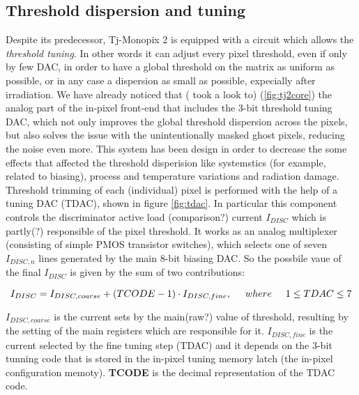 \subsection{Threshold dispersion and tuning}


Despite its predecessor, Tj-Monopix 2 is equipped with a circuit which allows the \textit{threshold tuning}. In other words it can adjust every pixel threshold, even if only by few DAC, in order to have a global threshold on the matrix as uniform as possible, or in any case a dispersion as small as possible, expecially after irradiation. We have already noticed that ( took a look to) (\vref{fig:tj2core}) the analog part of the in-pixel front-end that includes the 3-bit threshold tuning DAC, which not only improves the global threshold dispersion across the pixels, but also solves the issue with the unintentionally masked ghost pixels, reducing the noise even more. This system has been design in order to decrease the some effects that affected the threshold disperision like systemstics (for example, related to biasing), process and temperature variations and radiation damage. \\

Threshold trimming of each (individual) pixel is performed with the help of a tuning DAC (TDAC), shown in figure \vref{fig:tdac}. In particular this component controls the discriminator active load (comparison?) current $I_{DISC}$ which is partly(?) responsible of the pixel threshold. It works as an analog multiplexer (consisting of simple PMOS transistor switches), which selects one of seven $I_{DISC, n}$ lines generated by the main 8-bit biasing DAC. So the possbile vaue of the final $I_{DISC}$ is given by the sum of two contributions:

\begin{equation}
I_{DISC} = I_{DISC, coarse} + (TCODE - 1) \cdot I_{DISC,fine},  \hspace{.5cm}	where \hspace{.5cm} 1 \leq TDAC \leq 7
\end{equation}

\textbf{$I_{DISC, coarse}$} is the current sets by the main(raw?) value of threshold, resulting by the setting of the main registers which are responsible for it. 
\textbf{$I_{DISC, fine}$} is the current selected by the fine tuning step (TDAC) and it depends on the 3-bit tunning code that is stored in the in-pixel tuning memory latch (the in-pixel configuration memoty).
\textbf{TCODE} is the decimal representation of the TDAC code. 

